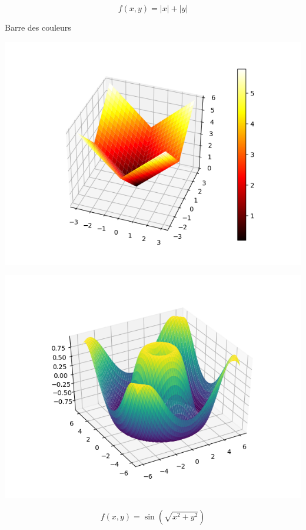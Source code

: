 \documentclass[11pt,class=report,crop=false]{standalone}
\begin{document}
\begin{minipage}{0.45\textwidth}
\begin{center}
$$f(x,y) = |x|+|y|$$

Barre des couleurs
\end{center}
\end{minipage}
\begin{minipage}{0.45\textwidth}
\begin{center}
\includegraphics[scale=\myscale,scale=0.6]{figures/pythonxy-surface-2}
\end{center}
\end{minipage}


\begin{minipage}{0.45\textwidth}
\begin{center}
\includegraphics[scale=\myscale,scale=0.6]{figures/pythonxy-surface-3}
\end{center}
\end{minipage}
\begin{minipage}{0.45\textwidth}
\begin{center}
$$f(x,y) = \sin\left(\sqrt{x^2+y^2}\right)$$
\end{center}
\end{minipage}
\end{document}
